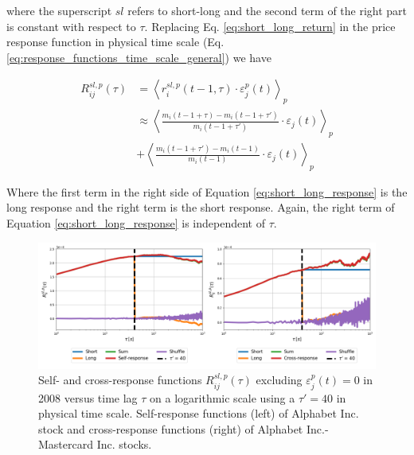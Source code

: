 where the superscript $sl$ refers to short-long and the second term of the
right part is constant with respect to $\tau$. Replacing Eq.
\ref{eq:short_long_return} in the price response function in physical time
scale (Eq. \ref{eq:response_functions_time_scale_general}) we have

\begin{align}\label{eq:short_long_response}
    R^{sl,p}_{ij}\left(\tau\right)&=\left\langle
    r^{sl,p}_{i}\left(t - 1, \tau\right)
    \cdot\varepsilon^{p}_{j}\left(t\right)\right\rangle _{p} \nonumber \\
    &\approx\left\langle \frac{m_{i}\left(t - 1 +\tau\right)-m_{i}
    \left(t - 1 +\tau'\right)} {m_{i}\left(t - 1 +\tau'\right)}
    \cdot\varepsilon_{j} \left(t\right)\right\rangle _{p} \nonumber \\
    & +\left\langle \frac{m_{i} \left(t - 1 +\tau'\right)-m_{i}
    \left(t - 1\right)}{m_{i}\left(t - 1\right)}
    \cdot\varepsilon_{j}\left(t\right)\right\rangle _{p}
\end{align}

Where the first term in the right side of Equation \ref{eq:short_long_response}
is the long response and the right term is the short response. Again, the right
term of Equation \ref{eq:short_long_response} is independent of $\tau$.

\begin{figure}[htbp]
    \centering
    \includegraphics[width=\textwidth]
    {figures/05_short_long_GOOG_MA.png}
    \caption{Self- and cross-response functions
             $R^{sl,p}_{ij}\left(\tau\right)$ excluding
             $\varepsilon^{p}_{j}\left(t\right) = 0$ in 2008 versus time lag
             $\tau$ on a logarithmic scale using a $\tau'=40$ in physical time
             scale. Self-response functions (left) of Alphabet Inc. stock and
             cross-response functions (right) of Alphabet Inc.-Mastercard Inc.
             stocks.}
    \label{fig:short_long_responses}
\end{figure}

